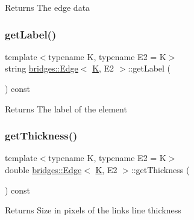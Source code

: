 \begin{DoxyReturn}{Returns}
The edge data 
\end{DoxyReturn}
\mbox{\label{classbridges_1_1_edge_a782f757603c38dd076c2c61b3ec8f37e}} 
\subsubsection{\texorpdfstring{getLabel()}{getLabel()}}
{\footnotesize\ttfamily template$<$typename K, typename E2 = K$>$ \\
string \mbox{\hyperlink{classbridges_1_1_edge}{bridges\+::\+Edge}}$<$ \mbox{\hyperlink{namespacebridges_acfb0a4f7877d8f63de3e6862004c50edaa5f3c6a11b03839d46af9fb43c97c188}{K}}, E2 $>$\+::get\+Label (\begin{DoxyParamCaption}{ }\end{DoxyParamCaption}) const\hspace{0.3cm}{\ttfamily [inline]}}

\begin{DoxyReturn}{Returns}
The label of the element 
\end{DoxyReturn}
\mbox{\label{classbridges_1_1_edge_a97166cb0de049612d233f2fecb55df06}} 
\subsubsection{\texorpdfstring{getThickness()}{getThickness()}}
{\footnotesize\ttfamily template$<$typename K, typename E2 = K$>$ \\
double \mbox{\hyperlink{classbridges_1_1_edge}{bridges\+::\+Edge}}$<$ \mbox{\hyperlink{namespacebridges_acfb0a4f7877d8f63de3e6862004c50edaa5f3c6a11b03839d46af9fb43c97c188}{K}}, E2 $>$\+::get\+Thickness (\begin{DoxyParamCaption}{ }\end{DoxyParamCaption}) const\hspace{0.3cm}{\ttfamily [inline]}}

\begin{DoxyReturn}{Returns}
Size in pixels of the link\textquotesingle{}s line thickness 
\end{DoxyReturn}
\mbox{\label{classbridges_1_1_edge_aa723bc0f8accdf7edf42635bf61b7e9b}} 
